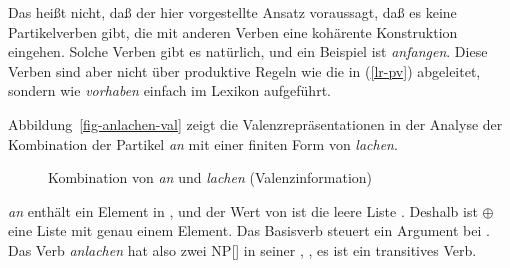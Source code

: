 \noindent
Das heißt nicht, daß der hier vorgestellte Ansatz voraussagt, daß es keine Partikelverben
gibt, die mit anderen Verben eine kohärente Konstruktion eingehen. Solche Verben gibt es
natürlich, und ein Beispiel ist \emph{anfangen}. Diese Verben sind aber nicht über produktive
Regeln wie die in (\ref{lr-pv}) abgeleitet, sondern wie \emph{vorhaben} einfach im Lexikon aufgeführt.

Abbildung~\vref{fig-anlachen-val} zeigt die Valenzrepräsentationen in der Analyse
der Kombination der Partikel \emph{an} mit einer finiten Form von \emph{lachen}.
\begin{figure}[htbp]
\begin{center}
\end{center}
\caption{Kombination von \emph{an} und \emph{lachen} (Valenzinformation)}\label{fig-anlachen-val}
\end{figure}
\emph{an} enthält ein Element in \subj {}, und der Wert von \subcat ist die leere Liste .
Deshalb ist  $\oplus$  eine Liste mit genau einem Element. Das Basisverb steuert
ein Argument bei . Das Verb \emph{anlachen} hat also zwei NP[\str] in seiner \subcatl, \dash, es ist ein transitives Verb.

